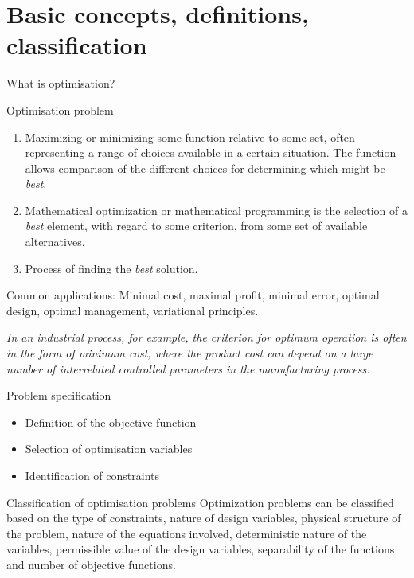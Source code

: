 \documentclass[10pt,aspectratio=169,notes]{beamer} %
\begin{document}
\section{Basic concepts, definitions, classification}
\begin{frame}[label=frame2]{What is optimisation?}
\begin{alertblock}{Optimisation problem}
	\begin{enumerate}
		\item Maximizing or minimizing some function relative to some set,
often representing a range of choices available in a certain situation. 
		The function
allows comparison of the different choices for determining which might be \emph{best}.
		\item Mathematical optimization or mathematical programming is the selection of a \emph{best} element, with regard to some criterion, from some set of available alternatives.
		\item Process of finding the \emph{best} solution.
	\end{enumerate}
	
\end{alertblock}

Common applications: Minimal cost, maximal profit, minimal error, optimal design,
optimal management, variational principles.


\emph{In an industrial process, for example, the criterion for
optimum operation is often in the form of minimum cost,
where the product cost can depend on a large number of
interrelated controlled parameters in the manufacturing
process.}
\begin{biblio}{}
\end{biblio}
\end{frame}
\note{}
\begin{frame}{Problem specification}
\begin{itemize}
	\item Definition of the objective function
	\item Selection of optimisation variables
	\item Identification of constraints
\end{itemize}	
\end{frame}
\note{}
\begin{frame}{Classification of optimisation problems}
Optimization problems can be classified based on
the type of constraints, nature of design variables,
physical structure of the problem, nature of the
equations involved, deterministic nature of the
variables, permissible value of the design variables,
separability of the functions and number of objective
functions.	
\end{frame}
\note{}
\end{document}

